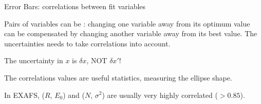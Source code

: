 \begin{slide}{Error Bars: correlations between fit variables}
\small
\hspace{-.1mm}
\begin{center}
  \begin{minipage}{95mm}\setlength{\baselineskip}{10pt}
    
    Pairs of variables can be {}: changing one variable away
    from its optimum value can be compensated by changing another variable away
    from its best value.  The uncertainties needs to take correlations into
    account.

    \vmm
    \begin{center}    \end{center}
      

    \vmm 
    The uncertainty in $x$ is $\delta x$, NOT  $\delta x'$!
    
    \vmm 
    
    The correlations values are useful statistics, measuring the ellipse shape.

    \vmm
    
    In EXAFS, ($R$, $E_0$) and ($N$, $\sigma^2$) are usually very highly
    correlated ($>0.85$).


  \end{minipage}
\end{center}
\vspace{1mm}
\vfill
\end{slide} 



\begin{slide}
  \small
  \begin{cenpage}{80mm}\setlength{\baselineskip}{10pt}
    \vfill
    \begin{center}
      {\Huge{}   }
  
    \end{center}
    \vfill
  \end{cenpage}
\end{slide} 



